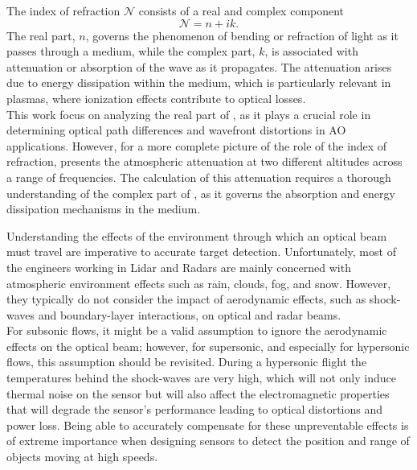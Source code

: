         The index of refraction $\mathcal{N}$ consists of a real and complex
        component
        \begin{equation}\label{eq:totalIndexOfRefraction}
            \mathcal{N} = n + ik.
        \end{equation}
        The real
        part, $n$, governs the phenomenon of bending or refraction of
        light as it passes through a medium, while the complex part, $k$, is
        associated with attenuation or absorption of the wave as it
        propagates. The attenuation arises due to energy dissipation within the
        medium, which is particularly relevant in plasmas, where ionization
        effects contribute to optical losses. \\

        This work focus on analyzing the real part of
        , as it plays a crucial role in
        determining optical path differences and wavefront distortions in
        \gls{AO} applications. However, for a more complete picture of the role
        of the index of refraction,
         presents the atmospheric attenuation at two
        different altitudes across a range of frequencies. The calculation of
        this attenuation requires a thorough understanding of the complex part
        of , as it governs the absorption and
        energy dissipation mechanisms in the medium.

        Understanding the effects of the environment through which an optical
        beam must travel are imperative to accurate target detection.
        Unfortunately, most of the engineers working in \gls{Lidar} and Radars
        are mainly concerned with atmospheric environment effects such as rain, clouds,
        fog, and snow. However, they typically do not consider the impact of
        aerodynamic effects, such as shock-waves and boundary-layer
        interactions, on optical and radar beams. \\

        For subsonic
        flows, it might be a valid assumption to ignore the aerodynamic effects
        on the optical beam; however, for supersonic, and especially for
        hypersonic flows, this assumption should be revisited. During a hypersonic
        flight the temperatures behind the shock-waves are very high, which
        will not only induce thermal noise on the sensor but will also affect the
        electromagnetic properties that will degrade the sensor's
        performance leading to optical distortions and power loss. Being able to accurately compensate for
        these unpreventable effects is of extreme importance when designing
        sensors to detect the position and range of objects moving at
        high speeds. \\


